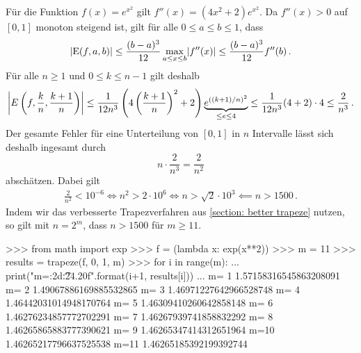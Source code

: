 \section{}

Für die Funktion $f(x) = e^{x^2}$ gilt $f''(x) = (4x^2 + 2) e^{x^2}$.
Da $f''(x) > 0$ auf $[0,1]$ monoton steigend ist, gilt für alle $0 \leq a \leq b \leq 1$, dass
\[
        \abs{ \operatorname{E}(f,a,b) }
  \leq  \frac{(b-a)^3}{12} \max_{a \leq x \leq b} \abs{f''(x)}
  \leq  \frac{(b-a)^3}{12} f''(b)\,.
\]
Für alle $n \geq 1$ und $0 \leq k \leq n-1$ gilt deshalb
\[
        \abs*{ E\left( f, \frac{k}{n}, \frac{k+1}{n} \right) }
  \leq  \frac{1}{12 n^3} \left( 4 \left(\frac{k+1}{n}\right)^2 + 2 \right) \underbrace{e^{((k+1)/n)^2}}_{\leq e \leq 4}
  \leq  \frac{1}{12 n^3} (4 + 2) \cdot 4
  \leq  \frac{2}{n^3}\,.
\]
Der gesamte Fehler für eine Unterteilung von $[0,1]$ in $n$ Intervalle lässt sich deshalb ingesamt durch
\[
      n \cdot \frac{2}{n^3}
    = \frac{2}{n^2}
\]
abschätzen.
Dabei gilt
\begin{align*}
              \frac{2}{n^2} < 10^{-6}
  \iff        n^2 > 2 \cdot 10^6
  \iff        n > \sqrt{2} \cdot 10^3
  \impliedby  n > 1500\,.
\end{align*}
Indem wir das verbesserte Trapezverfahren aus \ref{section: better trapeze} nutzen, so gilt mit $n = 2^m$, dass $n > 1500$ für $m \geq 11$.

\begin{consoleoutput}
>>> from math import exp
>>> f = (lambda x: exp(x**2))
>>> m = 11
>>> results = trapeze(f, 0, 1, m)
>>> for i in range(m):
...     print("m={:2d}\t{:24.20f}".format(i+1, results[i]))
... 
m= 1      1.57158316545863208091
m= 2      1.49067886169885532865
m= 3      1.46971227642966528748
m= 4      1.46442031014948170764
m= 5      1.46309410260642858148
m= 6      1.46276234857772702291
m= 7      1.46267939741858832292
m= 8      1.46265865883777390621
m= 9      1.46265347414312651964
m=10      1.46265217796637525538
m=11      1.46265185392199392744
\end{consoleoutput}
